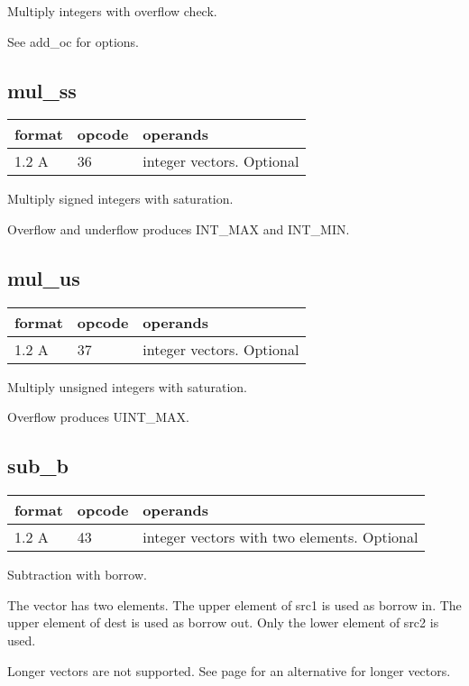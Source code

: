 \documentclass[forwardcom.tex]{subfiles}
\begin{document}
Multiply integers with overflow check.

See add\_oc for options.
\vv

\subsection{mul\_ss}
\label{table:mulSsInstruction}
\begin{tabular}{|p{12mm}|p{15mm}|p{100mm}|}
\hline
\bfseries format & \bfseries opcode & \bfseries operands \\ \hline
1.2 A & 36 & integer vectors. Optional \\ \hline
\end{tabular}
\vv

Multiply signed integers with saturation.

Overflow and underflow produces INT\_MAX and INT\_MIN.
\vv

\subsection{mul\_us}
\label{table:mulUsInstruction}
\begin{tabular}{|p{12mm}|p{15mm}|p{100mm}|}
\hline
\bfseries format & \bfseries opcode & \bfseries operands \\ \hline
1.2 A & 37 & integer vectors. Optional \\ \hline
\end{tabular}
\vv

Multiply unsigned integers with saturation.

Overflow produces UINT\_MAX.
\vv

\subsection{sub\_b}
\label{table:subBInstruction}
\begin{tabular}{|p{12mm}|p{15mm}|p{100mm}|}
\hline
\bfseries format & \bfseries opcode & \bfseries operands \\ \hline
1.2 A & 43 & integer vectors with two elements. Optional \\ \hline
\end{tabular}
\vv

Subtraction with borrow.
\vv

The vector has two elements. The upper element of src1 is used as borrow in. The upper element of dest is used as borrow out. Only the lower element of src2 is used.
\vv

Longer vectors are not supported. See page 
\pageref{highPrecisionArithmetic} for an alternative for longer vectors.
\vv
\end{document}
